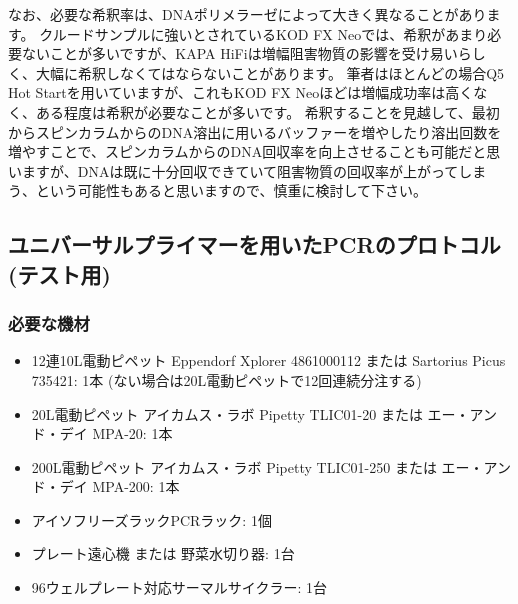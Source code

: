 \documentclass[titlepage,10pt,a4paper,uplatex]{jsbook}
\begin{document}
なお、必要な希釈率は、DNAポリメラーゼによって大きく異なることがあります。
クルードサンプルに強いとされているKOD FX Neoでは、希釈があまり必要ないことが多いですが、KAPA HiFiは増幅阻害物質の影響を受け易いらしく、大幅に希釈しなくてはならないことがあります。
筆者はほとんどの場合Q5 Hot Startを用いていますが、これもKOD FX Neoほどは増幅成功率は高くなく、ある程度は希釈が必要なことが多いです。
希釈することを見越して、最初からスピンカラムからのDNA溶出に用いるバッファーを増やしたり溶出回数を増やすことで、スピンカラムからのDNA回収率を向上させることも可能だと思いますが、DNAは既に十分回収できていて阻害物質の回収率が上がってしまう、という可能性もあると思いますので、慎重に検討して下さい。

\subsection{ユニバーサルプライマーを用いたPCRのプロトコル (テスト用)}

\subsubsection{必要な機材}
\begin{itemize}
\item 12連10{\textmu}L電動ピペット Eppendorf Xplorer 4861000112 または Sartorius Picus 735421: 1本 (ない場合は20{\textmu}L電動ピペットで12回連続分注する)
\item 20{\textmu}L電動ピペット アイカムス・ラボ Pipetty TLIC01-20 または エー・アンド・デイ MPA-20: 1本
\item 200{\textmu}L電動ピペット アイカムス・ラボ Pipetty TLIC01-250 または エー・アンド・デイ MPA-200: 1本
\item アイソフリーズラックPCRラック: 1個
\item プレート遠心機 または 野菜水切り器: 1台
\item 96ウェルプレート対応サーマルサイクラー: 1台
\end{itemize}
\end{document}
